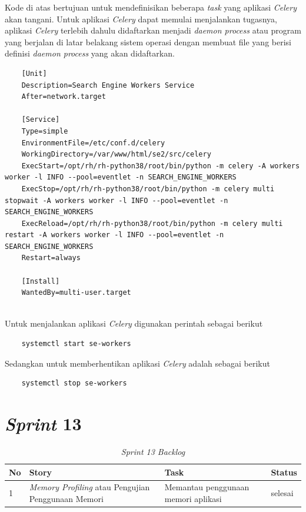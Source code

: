 Kode di atas bertujuan untuk mendefinisikan beberapa \textit{task} yang aplikasi \textit{Celery} akan tangani. Untuk aplikasi \textit{Celery} dapat memulai menjalankan tugasnya, aplikasi \textit{Celery} terlebih dahulu didaftarkan menjadi \textit{daemon process} atau program yang berjalan di latar belakang sistem operasi dengan membuat file yang berisi definisi \textit{daemon process} yang akan didaftarkan.  


\begin{lstlisting}
	[Unit]
	Description=Search Engine Workers Service
	After=network.target
	
	[Service]
	Type=simple
	EnvironmentFile=/etc/conf.d/celery
	WorkingDirectory=/var/www/html/se2/src/celery
	ExecStart=/opt/rh/rh-python38/root/bin/python -m celery -A workers worker -l INFO --pool=eventlet -n SEARCH_ENGINE_WORKERS
	ExecStop=/opt/rh/rh-python38/root/bin/python -m celery multi stopwait -A workers worker -l INFO --pool=eventlet -n SEARCH_ENGINE_WORKERS
	ExecReload=/opt/rh/rh-python38/root/bin/python -m celery multi restart -A workers worker -l INFO --pool=eventlet -n SEARCH_ENGINE_WORKERS
	Restart=always
	
	[Install]
	WantedBy=multi-user.target
	
\end{lstlisting}

Untuk menjalankan aplikasi \textit{Celery} digunakan perintah sebagai berikut 

\begin{lstlisting}
	systemctl start se-workers
\end{lstlisting}

Sedangkan untuk memberhentikan aplikasi \textit{Celery} adalah sebagai berikut 

\begin{lstlisting}
	systemctl stop se-workers
\end{lstlisting}




\section{\textit{Sprint} 13}


\begin{longtable}{@{}|p{0.5cm}|p{4cm}|p{6cm}|p{2cm}|@{}}
	\caption{\textit{Sprint 13 Backlog}}\\	
	\hline
	\textbf{No} & \textbf{Story} & \textbf{Task} & \textbf{Status} \\
	\hline
	1 & \textit{Memory Profiling} atau Pengujian Penggunaan Memori & Memantau penggunaan memori aplikasi & selesai \\
	\cline{3-4}
	\hline
	
\end{longtable}


